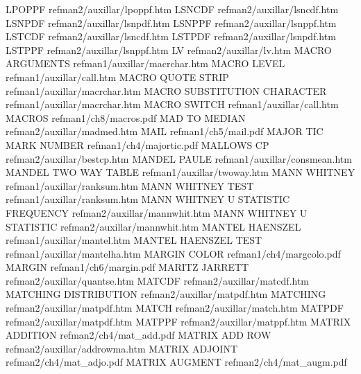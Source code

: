 LPOPPF                                  refman2/auxillar/lpoppf.htm
LSNCDF                                  refman2/auxillar/lsncdf.htm
LSNPDF                                  refman2/auxillar/lsnpdf.htm
LSNPPF                                  refman2/auxillar/lsnppf.htm
LSTCDF                                  refman2/auxillar/lsncdf.htm
LSTPDF                                  refman2/auxillar/lsnpdf.htm
LSTPPF                                  refman2/auxillar/lsnppf.htm
LV                                      refman2/auxillar/lv.htm
MACRO ARGUMENTS                         refman1/auxillar/macrchar.htm
MACRO LEVEL                             refman1/auxillar/call.htm
MACRO QUOTE STRIP                       refman1/auxillar/macrchar.htm
MACRO SUBSTITUTION CHARACTER            refman1/auxillar/macrchar.htm
MACRO SWITCH                            refman1/auxillar/call.htm
MACROS                                  refman1/ch8/macros.pdf
MAD TO MEDIAN                           refman2/auxillar/madmed.htm
MAIL                                    refman1/ch5/mail.pdf
MAJOR TIC MARK NUMBER                   refman1/ch4/majortic.pdf
MALLOWS CP                              refman2/auxillar/bestcp.htm
MANDEL PAULE                            refman1/auxillar/consmean.htm
MANDEL TWO WAY TABLE                    refman1/auxillar/twoway.htm
MANN WHITNEY                            refman1/auxillar/ranksum.htm
MANN WHITNEY TEST                       refman1/auxillar/ranksum.htm
MANN WHITNEY U STATISTIC FREQUENCY      refman2/auxillar/mannwhit.htm
MANN WHITNEY U STATISTIC                refman2/auxillar/mannwhit.htm
MANTEL HAENSZEL                         refman1/auxillar/mantel.htm
MANTEL HAENSZEL TEST                    refman1/auxillar/mantelha.htm
MARGIN COLOR                            refman1/ch4/margcolo.pdf
MARGIN                                  refman1/ch6/margin.pdf
MARITZ JARRETT                          refman2/auxillar/quantse.htm
MATCDF                                  refman2/auxillar/matcdf.htm
MATCHING DISTRIBUTION                   refman2/auxillar/matpdf.htm
MATCHING                                refman2/auxillar/matpdf.htm
MATCH                                   refman2/auxillar/match.htm
MATPDF                                  refman2/auxillar/matpdf.htm
MATPPF                                  refman2/auxillar/matppf.htm
MATRIX ADDITION                         refman2/ch4/mat_add.pdf
MATRIX ADD ROW                          refman2/auxillar/addrowma.htm
MATRIX ADJOINT                          refman2/ch4/mat_adjo.pdf
MATRIX AUGMENT                          refman2/ch4/mat_augm.pdf
